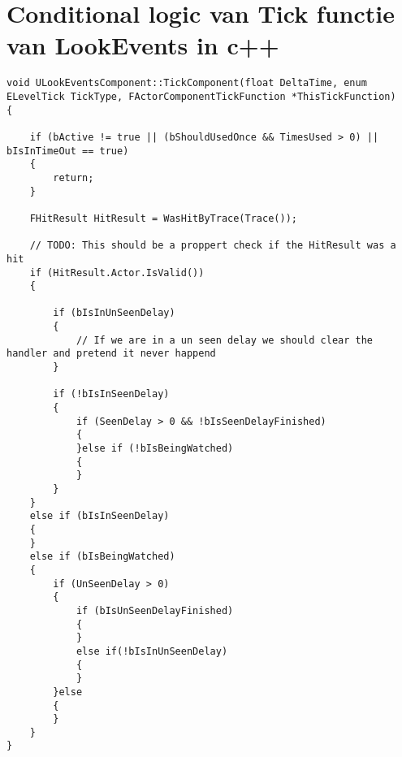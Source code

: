 \chapter{Conditional logic van Tick functie van LookEvents in c++}
\label{appendix:LookEventsLogicC}

\begin{lstlisting}
void ULookEventsComponent::TickComponent(float DeltaTime, enum ELevelTick TickType, FActorComponentTickFunction *ThisTickFunction) 
{

	if (bActive != true || (bShouldUsedOnce && TimesUsed > 0) || bIsInTimeOut == true) 
	{
		return;
	}

	FHitResult HitResult = WasHitByTrace(Trace());

	// TODO: This should be a proppert check if the HitResult was a hit 
	if (HitResult.Actor.IsValid())
	{

		if (bIsInUnSeenDelay) 
		{
			// If we are in a un seen delay we should clear the handler and pretend it never happend
		}

		if (!bIsInSeenDelay) 
		{
			if (SeenDelay > 0 && !bIsSeenDelayFinished) 
			{
			}else if (!bIsBeingWatched) 
			{		
			}
		}
	}
	else if (bIsInSeenDelay)
	{
	}
	else if (bIsBeingWatched) 
	{
		if (UnSeenDelay > 0) 
		{
			if (bIsUnSeenDelayFinished) 
			{				
			}
			else if(!bIsInUnSeenDelay)
			{					
			}
		}else
		{
		}
	}
}
\end{lstlisting}
